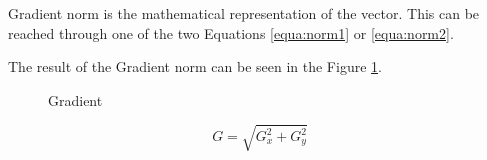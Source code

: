 \documentclass{article}
\begin{document}
Gradient norm is the mathematical representation of the vector. This can be reached through one of the two Equations \ref{equa:norm1} or \ref{equa:norm2}.

The result of the Gradient norm can be seen in the Figure \ref{fig:norm_gradient}. 

\begin{figure}[H]
	\centering
	\caption{Gradient}
	\label{fig:norm_gradient}
\end{figure}


\begin{equation}
G = \sqrt{G_x^{2}+G_y^{2}}
\label{equa:norm1}
\end{equation}
\end{document}

